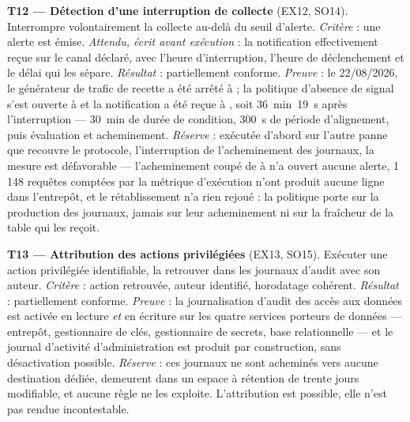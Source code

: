\textbf{T12 --- Détection d'une interruption de collecte} (EX12, SO14). Interrompre volontairement
la collecte au-delà du seuil d'alerte. \emph{Critère} : une alerte est émise. \emph{Attendu, écrit
avant exécution} : la notification effectivement reçue sur le canal déclaré, avec l'heure
d'interruption, l'heure de déclenchement et le délai qui les sépare. \emph{Résultat} :
partiellement conforme. \emph{Preuve} : le 22/08/2026, le générateur de trafic de recette a été arrêté à  ;
la politique d'absence de signal s'est ouverte à  et la notification a été reçue à
, soit 36~min~19~s après l'interruption --- 30~min de durée de condition, 300~s de
période d'alignement, puis évaluation et acheminement. \emph{Réserve} : exécutée d'abord sur
l'autre panne que recouvre le protocole, l'interruption de l'acheminement des journaux, la mesure
est défavorable --- l'acheminement coupé de  à  n'a ouvert aucune alerte,
1\,148 requêtes comptées par la métrique d'exécution n'ont produit aucune ligne dans l'entrepôt, et
le rétablissement n'a rien rejoué : la politique porte sur la production des journaux, jamais sur
leur acheminement ni sur la fraîcheur de la table qui les reçoit.

\textbf{T13 --- Attribution des actions privilégiées} (EX13, SO15). Exécuter une action
privilégiée identifiable, la retrouver dans les journaux d'audit avec son auteur. \emph{Critère} :
action retrouvée, auteur identifié, horodatage cohérent. \emph{Résultat} : partiellement conforme.
\emph{Preuve} : la journalisation d'audit des accès aux données est activée en lecture \emph{et} en
écriture sur les quatre services porteurs de données --- entrepôt, gestionnaire de clés,
gestionnaire de secrets, base relationnelle --- et le journal d'activité d'administration est
produit par construction, sans désactivation possible. \emph{Réserve} : ces journaux ne sont
acheminés vers aucune destination dédiée, demeurent dans un espace à rétention de trente jours
modifiable, et aucune règle ne les exploite. L'attribution est possible, elle n'est pas rendue
incontestable.

